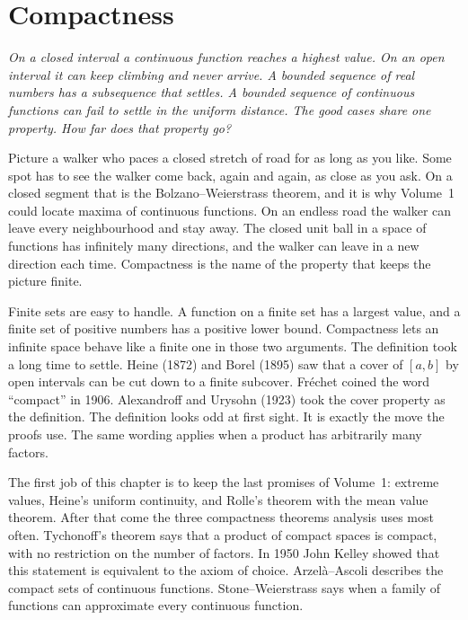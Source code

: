 \chapter{Compactness}\label{ch:compact}

\begin{center}\itshape
On a closed interval a continuous function reaches a highest value. On an open interval it can keep climbing and never arrive. A bounded sequence of real numbers has a subsequence that settles. A bounded sequence of continuous functions can fail to settle in the uniform distance. The good cases share one property. How far does that property go?
\end{center}

Picture a walker who paces a closed stretch of road for as long as you like. Some spot has to see the walker come back, again and again, as close as you ask. On a closed segment that is the Bolzano--Weierstrass theorem, and it is why Volume~1 could locate maxima of continuous functions. On an endless road the walker can leave every neighbourhood and stay away. The closed unit ball in a space of functions has infinitely many directions, and the walker can leave in a new direction each time. Compactness is the name of the property that keeps the picture finite.

Finite sets are easy to handle. A function on a finite set has a largest value, and a finite set of positive numbers has a positive lower bound. Compactness lets an infinite space behave like a finite one in those two arguments. The definition took a long time to settle. Heine (1872) and Borel (1895) saw that a cover of $[a,b]$ by open intervals can be cut down to a finite subcover. Fr\'echet coined the word ``compact'' in 1906. Alexandroff and Urysohn (1923) took the cover property as the definition. The definition looks odd at first sight. It is exactly the move the proofs use. The same wording applies when a product has arbitrarily many factors.

The first job of this chapter is to keep the last promises of Volume~1: extreme values, Heine's uniform continuity, and Rolle's theorem with the mean value theorem. After that come the three compactness theorems analysis uses most often. Tychonoff's theorem says that a product of compact spaces is compact, with no restriction on the number of factors. In 1950 John Kelley showed that this statement is equivalent to the axiom of choice. Arzel\`a--Ascoli describes the compact sets of continuous functions. Stone--Weierstrass says when a family of functions can approximate every continuous function.

